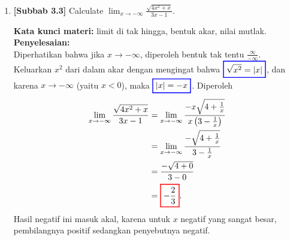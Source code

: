 \documentclass[10pt,openany,a4paper]{article}
\theoremstyle{definition}
\theoremstyle{definition}
\theoremstyle{plain}
\newenvironment{jawab}[2][tes]{%
\par\noindent\textbf{Kata kunci materi:} #1.\\
\textbf{Penyelesaian:} #2%
}{}
\begin{document}
\begin{enumerate}
    \item \textbf{[Subbab 3.3]} Calculate $\displaystyle\lim_{x\to-\infty}\frac{\sqrt{4x^2+x}}{3x-1}$.
    \begin{jawab}[limit di tak hingga, bentuk akar, nilai mutlak]{~\\
        Diperhatikan bahwa jika $x\to-\infty$, diperoleh bentuk tak tentu $\frac{\infty}{-\infty}$. Keluarkan $x^2$ dari dalam akar dengan mengingat bahwa $\colorlet{oldcolor}{.}
        \color{blue}
        \setlength{\fboxrule}{1pt} \boxed{\color{oldcolor}\sqrt{x^2}=|x|}\color{oldcolor}$, dan karena $x\to-\infty$ (yaitu $x<0$), maka $\colorlet{oldcolor}{.}
        \color{blue}
        \setlength{\fboxrule}{1pt} \boxed{\color{oldcolor}|x|=-x}\color{oldcolor}$. Diperoleh
        \begin{align*}
            \lim_{x\to-\infty}\frac{\sqrt{4x^2+x}}{3x-1} &= \lim_{x\to-\infty}\frac{-x\sqrt{4+\frac{1}{x}}}{x\left(3-\frac{1}{x}\right)}\\
            &= \lim_{x\to-\infty}\frac{-\sqrt{4+\frac{1}{x}}}{3-\frac{1}{x}}\\
            &= \frac{-\sqrt{4+0}}{3-0}\\
            &= \colorlet{oldcolor}{.}
        \color{red}
        \setlength{\fboxrule}{1pt} \boxed{\color{oldcolor}-\frac{2}{3}}\color{oldcolor}.
        \end{align*}
        Hasil negatif ini masuk akal, karena untuk $x$ negatif yang sangat besar, pembilangnya positif sedangkan penyebutnya negatif.
    }
    \end{jawab}


\end{enumerate}
\end{document}
